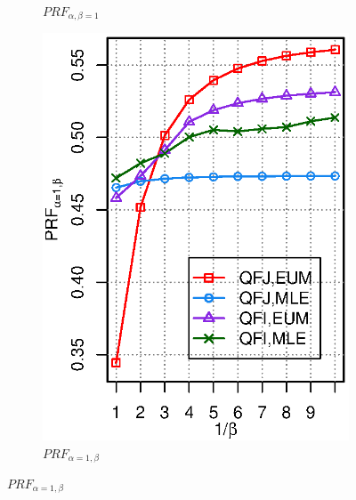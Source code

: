 \begin{figure}[ht!]
\begin{subfigure}[b]{0.45\columnwidth}
\caption{$P\!R\!F_{\alpha,\beta=1}$}
\end{subfigure}
\begin{subfigure}[b]{0.45\columnwidth}
\includegraphics[width=\columnwidth]{figure/qf13-prfaf-qfi-qfj.eps}
\caption{$P\!R\!F_{\alpha=1,\beta}$}
\end{subfigure}
\end{figure}
